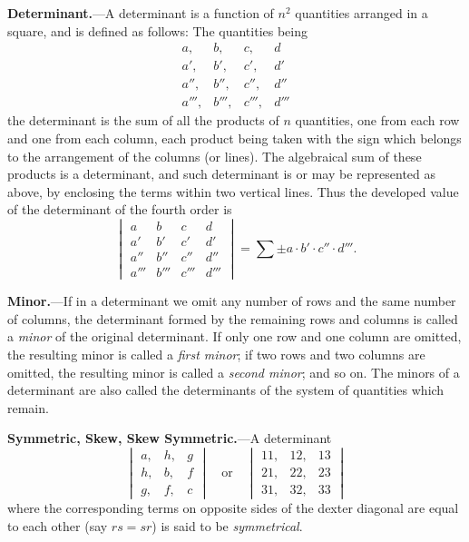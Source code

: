 \documentclass[12pt,a4paper]{article}
\theoremstyle{definition}
\begin{document}
\vspace{1em}

\noindent\textbf{Determinant.}---A determinant is a function of $n^2$ quantities arranged in a square, and is defined as follows: The quantities being
\[
\begin{array}{cccc}
a, & b, & c, & d \\
a', & b', & c', & d' \\
a'', & b'', & c'', & d'' \\
a''', & b''', & c''', & d'''
\end{array}
\]
the determinant is the sum of all the products of $n$ quantities, one from each row and one from each column, each product being taken with the sign which belongs to the arrangement of the columns (or lines). The algebraical sum of these products is a determinant, and such determinant is or may be represented as above, by enclosing the terms within two vertical lines. Thus the developed value of the determinant of the fourth order is
\[
\begin{vmatrix}
a & b & c & d \\
a' & b' & c' & d' \\
a'' & b'' & c'' & d'' \\
a''' & b''' & c''' & d'''
\end{vmatrix}
= \sum \pm a \cdot b' \cdot c'' \cdot d'''.
\]

\vspace{1em}

\noindent\textbf{Minor.}---If in a determinant we omit any number of rows and the same number of columns, the determinant formed by the remaining rows and columns is called a \textit{minor} of the original determinant. If only one row and one column are omitted, the resulting minor is called a \textit{first minor}; if two rows and two columns are omitted, the resulting minor is called a \textit{second minor}; and so on. The minors of a determinant are also called the determinants of the system of quantities which remain.

\vspace{1em}

\noindent\textbf{Symmetric, Skew, Skew Symmetric.}---A determinant
\[
\begin{vmatrix}
a, & h, & g \\
h, & b, & f \\
g, & f, & c
\end{vmatrix}
\quad\text{or}\quad
\begin{vmatrix}
11, & 12, & 13 \\
21, & 22, & 23 \\
31, & 32, & 33
\end{vmatrix}
\]
where the corresponding terms on opposite sides of the dexter diagonal are equal to each other (say $rs = sr$) is said to be \textit{symmetrical}.
\end{document}
